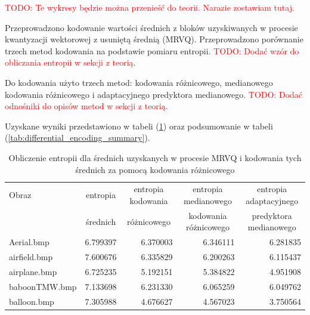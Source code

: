 \documentclass{article}
\newcommand{\todo}[1]{\textcolor{red}{TODO: #1}}
\begin{document}
\todo{Te wykresy będzie można przenieść do teorii. Narazie zostawiam tutaj.}

Przeprowadzono kodowanie wartości średnich z bloków uzyskiwanych w procesie kwantyzacji wektorowej z usuniętą średnią (MRVQ). Przeprowadzono porównanie trzech metod kodowania na podstawie pomiaru entropii. \todo{Dodać wzór do obliczania entropii w sekcji z teorią}.

Do kodowania użyto trzech metod: kodowania różnicowego, medianowego kodowania różnicowego i adaptacyjnego predyktora medianowego.
\todo{Dodać odnośniki do opisów metod w sekcji z teorią}.

Uzyskane wyniki przedstawiono w tabeli (\ref{tab:differential_encoding_all}) oraz podsumowanie w tabeli (\ref{tab:differential_encoding_summary}).

\begin{table}[H]
  \caption{Obliczenie entropii dla średnich uzyskanych w procesie MRVQ i kodowania tych średnich za pomocą kodowania różnicowego}
  \label{tab:differential_encoding_all}
  \centering
  \begin{tabular}{lrrrr}
    \toprule
    {Obraz}            & \multicolumn{1}{c}{entropia} & \multicolumn{1}{c}{entropia kodowania} & \multicolumn{1}{c}{entropia medianowego}  & \multicolumn{1}{c}{entropia adaptacyjnego} \\
    {}                 & \multicolumn{1}{c}{średnich} & \multicolumn{1}{c}{różnicowego}        & \multicolumn{1}{c}{kodowania różnicowego} & \multicolumn{1}{c}{predyktora medianowego} \\
    \midrule
    Aerial.bmp         & 6.799397                     & 6.370003                               & 6.346111                                  & 6.281835                                   \\
    airfield.bmp       & 7.600676                     & 6.335829                               & 6.200263                                  & 6.115437                                   \\
    airplane.bmp       & 6.725235                     & 5.192151                               & 5.384822                                  & 4.951908                                   \\
    baboonTMW.bmp      & 7.133698                     & 6.231330                               & 6.065259                                  & 6.049762                                   \\
    balloon.bmp        & 7.305988                     & 4.676627                               & 4.567023                                  & 3.750564                                   \\

\end{tabular}
\end{table}
\end{document}
